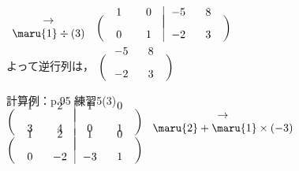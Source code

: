 \documentclass[a4paper,10pt,onecolumn,oneside,notitlepage,final]{jsarticle} %
\begin{document}
$\begin{array}{ll}
\hfill\to\hfill\\
\maru{1}\div(3)\\
\end{array}$
$\left(\begin{array}{cc|cc}
\hspace{6mm}&\hspace{6mm}&\hspace{6mm}&\hspace{6mm}\\[-7mm]
   1&   0&  -5&   8\\[3mm]
   0&   1&  -2&   3\\
\end{array}\right)$

よって逆行列は，
$\left(\begin{array}{cc}
\hspace{6mm}&\hspace{6mm}\\[-7mm]
  -5&   8\\[3mm]
  -2&   3\\
\end{array}\right)$

\vspace{10mm}
計算例：p.95 練習5(3)\\%

$\left(\begin{array}{cc|cc}
\hspace{6mm}&\hspace{6mm}&\hspace{6mm}&\hspace{6mm}\\[-7mm]
   1&   2&   1&   0\\[3mm]
   3&   4&   0&   1\\
\end{array}\right)$
$\begin{array}{ll}
\hfill\to\hfill\\
\maru{2}+\maru{1}\times(-3)\\
\end{array}$
$\left(\begin{array}{cc|cc}
\hspace{6mm}&\hspace{6mm}&\hspace{6mm}&\hspace{6mm}\\[-7mm]
   1&   2&   1&   0\\[3mm]
   0&  -2&  -3&   1\\
\end{array}\right)$
\end{document}
